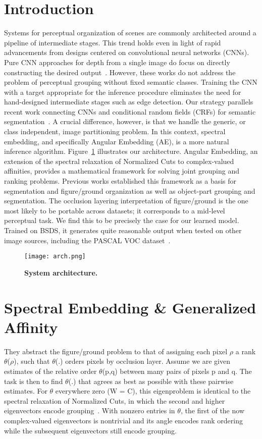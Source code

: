 \documentclass[10pt,twocolumn,letterpaper]{article}
\begin{document}
\section{Introduction}
Systems for perceptual organization of scenes are commonly architected around a pipeline of intermediate stages.  This trend holds even in light of rapid advancements from designs centered on convolutional neural networks (CNNs). Pure CNN approaches for depth from a single image do focus on directly constructing the desired output~\cite{name9,name8}. However, these works do not address the problem of perceptual grouping without fixed semantic classes.  Training the CNN with a target appropriate for the inference procedure eliminates the need for hand-designed intermediate stages such as edge detection. Our strategy parallels recent work connecting CNNs and conditional random fields (CRFs) for semantic segmentation~\cite{name6}. A crucial difference, however, is that we handle the generic, or class independent, image partitioning problem. In this context, spectral embedding, and specifically Angular Embedding (AE), is a more natural inference algorithm. Figure~\ref{Figure1} illustrates our architecture. Angular Embedding, an extension of the spectral relaxation of Normalized Cuts to complex-valued affinities, provides a mathematical framework for solving joint grouping and ranking problems. Previous works established this framework as a basis for segmentation and figure/ground organization as well as object-part grouping and segmentation. The occlusion layering interpretation of figure/ground is the one most likely to be portable across datasets; it corresponds to a mid-level perceptual task. We find this to be precisely the case for our learned model. Trained on BSDS, it generates quite reasonable output when tested on other image sources, including the PASCAL VOC dataset~\cite{name15}.
\begin{figure}[!htb]
 \centering
 \texttt{[image: arch.png]}\\
 \caption{\textbf{System architecture.}}\label{Figure1}
 \end{figure}
\section{Spectral Embedding \& Generalized Affinity}
They abstract the figure/ground problem to that of assigning each pixel $\rho$ a rank $\theta$($\rho$), such that $\theta$(.) orders pixels by occlusion layer. Assume we are given estimates of the relative order $\theta$(p,q) between many pairs of pixels p and q. The task is then to find $\theta$(.) that agrees as best as possible with these pairwise estimates. For $\theta$ everywhere zero (W = C), this eigenproblem is identical to the spectral relaxation of Normalized Cuts, in which the second and higher eigenvectors encode grouping~\cite{name2}. With nonzero entries in $\theta$, the first of the now complex-valued eigenvectors is nontrivial and its angle encodes rank ordering while the subsequent eigenvectors still encode grouping.


\end{document}
